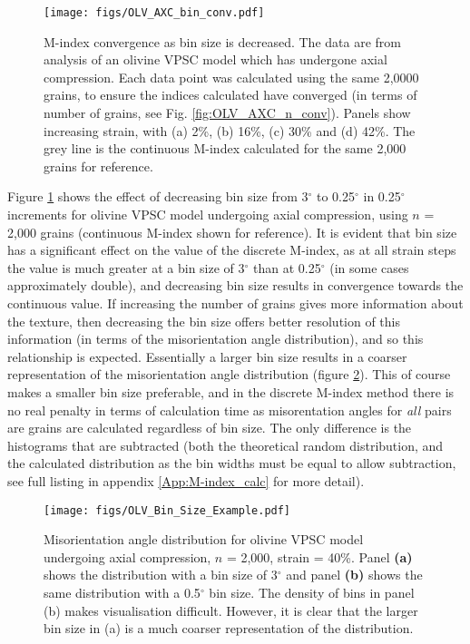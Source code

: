 \documentclass[a4paper,12pt]{report}
\numberwithin{equation}{chapter}
\begin{document}
\begin{figure}[b!]
  \centering
    \texttt{[image: figs/OLV\_AXC\_bin\_conv.pdf]}
  \caption[Convergence with bin size (olivine)]{M-index convergence as bin size is decreased. The data are from analysis of an olivine VPSC model which has undergone axial compression. Each data point was calculated using the same 2,0000 grains, to ensure the indices calculated have converged (in terms of number of grains, see Fig. \ref{fig:OLV_AXC_n_conv}). Panels show increasing strain, with (a) 2\%, (b) 16\%, (c) 30\% and (d) 42\%. The grey line is the continuous M-index calculated for the same 2,000 grains for reference.}
  \label{fig:OLV_AXC_b_conv}
\end{figure}  

Figure \ref{fig:OLV_AXC_b_conv} shows the effect of decreasing bin size from 3$^\circ$ to 0.25$^\circ$ in 0.25$^\circ$ increments for olivine VPSC model undergoing axial compression, using $n$ = 2,000 grains (continuous M-index shown for reference). It is evident that bin size has a significant effect on the value of the discrete M-index, as at all strain steps the value is much greater at a bin size of 3$^\circ$ than at 0.25$^\circ$ (in some cases approximately double), and decreasing bin size results in convergence towards the continuous value. If increasing the number of grains gives more information about the texture, then decreasing the bin size offers better resolution of this information (in terms of the misorientation angle distribution), and so this relationship is expected. Essentially a larger bin size results in a coarser representation of the misorientation angle distribution (figure \ref{fig:OLV_bin_size_example}). This of course makes a smaller bin size preferable, and in the discrete M-index method there is no real penalty in terms of calculation time as misorentation angles for \emph{all} pairs are grains are calculated regardless of bin size. The only difference is the histograms that are subtracted (both the theoretical random distribution, and the calculated distribution as the bin widths must be equal to allow subtraction, see full listing in appendix \ref{App:M-index_calc} for more detail).

\begin{figure}[h]
  \centering
    \texttt{[image: figs/OLV\_Bin\_Size\_Example.pdf]}
  \caption[Bin size example (olivine VPSC)]{Misorientation angle distribution for olivine VPSC model undergoing axial compression, $n$ = 2,000, strain = 40\%. Panel \textbf{(a)} shows the distribution with a bin size of 3$^\circ$ and panel \textbf{(b)} shows the same distribution with a 0.5$^\circ$ bin size. The density of bins in panel (b) makes visualisation difficult. However, it is clear that the larger bin size in (a) is a much coarser representation of the distribution.}
  \label{fig:OLV_bin_size_example}
\end{figure}  
\end{document}
